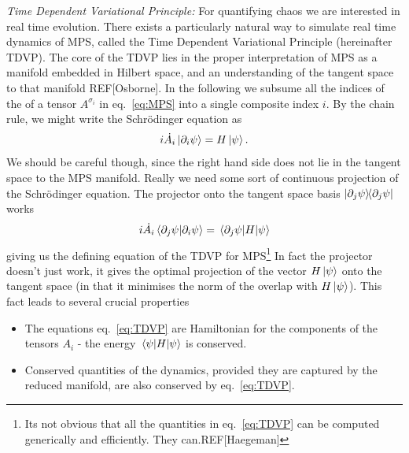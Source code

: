 \documentclass{article}
\begin{document}
{\noindent \it Time Dependent Variational Principle: } For quantifying chaos we are interested in real time evolution. 
There exists a particularly natural way to simulate real time dynamics of MPS, called the Time Dependent Variational Principle (hereinafter TDVP).
The core of the TDVP lies in the proper interpretation of MPS as a manifold embedded in Hilbert space, and an understanding of the tangent space to that manifold REF[Osborne].
In the following we subsume all the indices of the of a tensor $A^{\sigma_i}$ in eq.~\ref{eq:MPS} into a single composite index $i$.
By the chain rule, we might write the Schr\"odinger equation as
\begin{equation}
    i \dot{A_i} \ket{\partial_i\psi} = H\ket{\psi}.
\end{equation}
We should be careful though, since the right hand side does not lie in the tangent space to the MPS manifold. 
Really we need some sort of continuous projection of the Schr\"odinger equation.
The projector onto the tangent space basis $\ketbra{\partial_j\psi}{\partial_j\psi}$ works
\begin{equation}
    i \dot{A_i} \braket{\partial_j\psi}{\partial_i\psi} = \mel{\partial_j\psi}{H}{\psi}\label{eq:TDVP}
\end{equation}
giving us the defining equation of the TDVP for MPS\footnote{Its not obvious that all the quantities in eq.~\ref{eq:TDVP} can be computed generically and efficiently. They can.REF[Haegeman]}
In fact the projector doesn't just work, it gives the optimal projection of the vector $H\ket{\psi}$ onto the tangent space (in that it minimises the norm of the overlap with $H\ket{\psi}$).
This fact leads to several crucial properties
\begin{itemize}
    \item The equations eq.~\ref{eq:TDVP} are Hamiltonian for the components of the tensors $A_i$ - the energy $\ev{H}{\psi}$ is conserved. 
    \item Conserved quantities of the dynamics, provided they are captured by the reduced manifold, are also conserved by eq.~\ref{eq:TDVP}.
\end{itemize}
%
\end{document}
